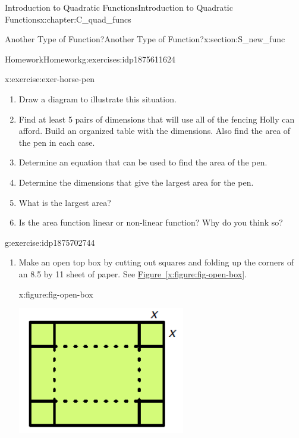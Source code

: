 \documentclass[oneside,10pt,]{book}
\newcommand{\xreffont}{\relax}
\numberwithin{equation}{chapter}
\begin{document}
\begin{chapterptx}{Introduction to Quadratic Functions}{}{Introduction to Quadratic Functions}{}{}{x:chapter:C_quad_funcs}
\begin{sectionptx}{Another Type of Function?}{}{Another Type of Function?}{}{}{x:section:S_new_func}
\begin{exercises-subsection}{Homework}{}{Homework}{}{}{g:exercises:idp1875611624}
\begin{divisionexercise}{6}{}{}{x:exercise:exer-horse-pen}
\begin{enumerate}[font=\bfseries,label=(\alph*),ref=\alph*]
\item{}Draw a diagram to illustrate this situation.%
\item{}Find at least 5 pairs of dimensions that will use all of the fencing Holly can afford. Build an organized table with the dimensions. Also find the area of the pen in each case.%
\item{}Determine an equation that can be used to find the area of the pen.%
\item{}Determine the dimensions that give the largest area for the pen.%
\item{}What is the largest area?%
\item{}Is the area function linear or non-linear function? Why do you think so?%
\end{enumerate}
\end{divisionexercise}%
\begin{divisionexercise}{7}{}{}{g:exercise:idp1875702744}%
\begin{enumerate}[font=\bfseries,label=(\alph*),ref=\alph*]
\item{}Make an open top box by cutting out squares and folding up the corners of an 8.5 by 11 sheet of paper. See \hyperref[x:figure:fig-open-box]{Figure~{\xreffont\ref{x:figure:fig-open-box}}}.%
\begin{figureptx}{}{x:figure:fig-open-box}{}%
\begin{image}{0.3}{0.4}{0.3}%
\includegraphics[width=\linewidth]{external/open-box.pdf}
\end{image}%

\end{figureptx}
\end{enumerate}
\end{divisionexercise}
\end{exercises-subsection}
\end{sectionptx}
\end{chapterptx}
\end{document}
